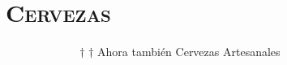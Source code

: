\section{\textsc{\textbf{Cervezas}}}
$ \>  \>  \>  \>  \>  \>  \>  \>  \>  \>  \>  \>  \>  \>  \>  \>  \>  \>  \>  \>  \>  \>  \>  \>  \>  \>  \>  \>  $ $\dag$ $\dag$
Ahora también Cervezas Artesanales 

